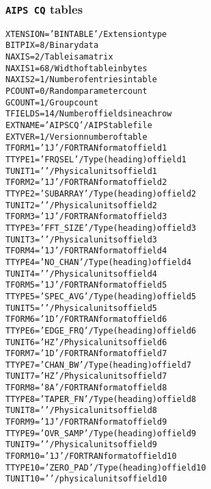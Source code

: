 \documentclass[twoside]{article}
\begin{document}
\subsubsection{{\tt AIPS CQ} tables}
\label{Appe:CQtable}
\begin{alltt}
XTENSION= 'BINTABLE'           / Extension type
BITPIX  =                    8 / Binary data
NAXIS   =                    2 / Table is a matrix
NAXIS1  =                   68 / Width of table in bytes
NAXIS2  =                    1 / Number of entries in table
PCOUNT  =                    0 / Random parameter count
GCOUNT  =                    1 / Group count
TFIELDS =                   14 / Number of fields in each row
EXTNAME = 'AIPS CQ '           / AIPS table file
EXTVER  =                    1 / Version number of table
TFORM1  = '1J      '           / FORTRAN format of field  1
TTYPE1  = 'FRQSEL          '   / Type (heading) of field  1
TUNIT1  = '        '           / Physical units of field  1
TFORM2  = '1J      '           / FORTRAN format of field  2
TTYPE2  = 'SUBARRAY        '   / Type (heading) of field  2
TUNIT2  = '        '           / Physical units of field  2
TFORM3  = '1J      '           / FORTRAN format of field  3
TTYPE3  = 'FFT_SIZE        '   / Type (heading) of field  3
TUNIT3  = '        '           / Physical units of field  3
TFORM4  = '1J      '           / FORTRAN format of field  4
TTYPE4  = 'NO_CHAN         '   / Type (heading) of field  4
TUNIT4  = '        '           / Physical units of field  4
TFORM5  = '1J      '           / FORTRAN format of field  5
TTYPE5  = 'SPEC_AVG        '   / Type (heading) of field  5
TUNIT5  = '        '           / Physical units of field  5
TFORM6  = '1D      '           / FORTRAN format of field  6
TTYPE6  = 'EDGE_FRQ        '   / Type (heading) of field  6
TUNIT6  = 'HZ      '           / Physical units of field  6
TFORM7  = '1D      '           / FORTRAN format of field  7
TTYPE7  = 'CHAN_BW         '   / Type (heading) of field  7
TUNIT7  = 'HZ      '           / Physical units of field  7
TFORM8  = '8A      '           / FORTRAN format of field  8
TTYPE8  = 'TAPER_FN        '   / Type (heading) of field  8
TUNIT8  = '        '           / Physical units of field  8
TFORM9  = '1J      '           / FORTRAN format of field  9
TTYPE9  = 'OVR_SAMP        '   / Type (heading) of field  9
TUNIT9  = '        '           / Physical units of field  9
TFORM10 = '1J      '           / FORTRAN format of field 10
TTYPE10 = 'ZERO_PAD        '   / Type (heading) of field 10
TUNIT10 = '        '           / physical units of field 10

\end{alltt}
\end{document}
